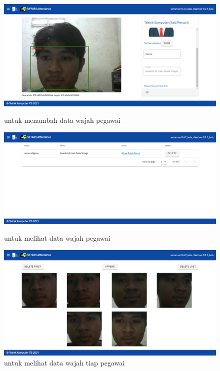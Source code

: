 \begin{figure} [p] \centering
  \includegraphics[scale=0.2]{gambar/addpersonfix.png}
  \caption{ untuk menambah data wajah pegawai}
  \label{fig:SfAddperson}

  \includegraphics[scale=0.2]{gambar/listperson.png}
  \caption{ untuk melihat data wajah pegawai}
  \label{fig:SfListperson}

  \includegraphics[scale=0.2]{gambar/listface.png}
  \caption{ untuk melihat data wajah tiap pegawai}
  \label{fig:SfListperson}
\end{figure}

